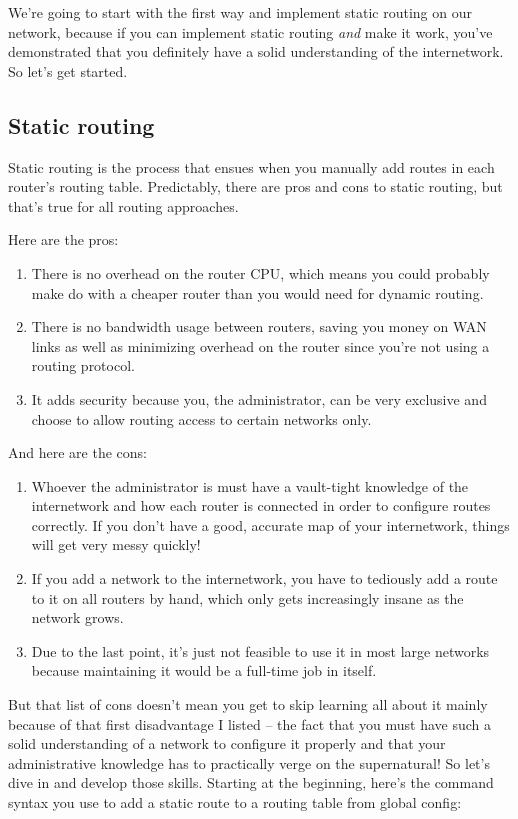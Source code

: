 We're going to start with the first way and implement static routing on
our network, because if you can implement static routing \emph{and} make
it work, you've demonstrated that you definitely have a solid
understanding of the internetwork. So let's get started.

\subsection{Static routing}

Static routing is the process that ensues when you manually add routes
in each router's routing table. Predictably, there are pros and cons to
static routing, but that's true for all routing approaches.

Here are the pros:

\begin{enumerate}
\item
  There is no overhead on the router CPU, which means you could probably
  make do with a cheaper router than you would need for dynamic routing.
\item
  There is no bandwidth usage between routers, saving you money on WAN
  links as well as minimizing overhead on the router since you're not
  using a routing protocol.
\item
  It adds security because you, the administrator, can be very exclusive
  and choose to allow routing access to certain networks only.
\end{enumerate}

And here are the cons:

\begin{enumerate}
\item
  Whoever the administrator is must have a vault-tight knowledge of the
  internetwork and how each router is connected in order to configure
  routes correctly. If you don't have a good, accurate map of your
  internetwork, things will get very messy quickly!
\item
  If you add a network to the internetwork, you have to tediously add a
  route to it on all routers by hand, which only gets increasingly
  insane as the network grows.
\item
  Due to the last point, it's just not feasible to use it in most large
  networks because maintaining it would be a full-time job in itself.
\end{enumerate}

But that list of cons doesn't mean you get to skip learning all about it
mainly because of that first disadvantage I listed -- the fact that you
must have such a solid understanding of a network to configure it
properly and that your administrative knowledge has to practically
\protect\hypertarget{c09.xhtmlux5cux23Page_383}{}{}verge on the
supernatural! So let's dive in and develop those skills. Starting at the
beginning, here's the command syntax you use to add a static route to a
routing table from global config:


